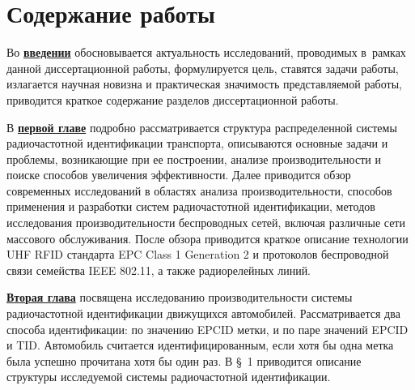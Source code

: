 \section*{Содержание работы}
Во \underline{\textbf{введении}} обосновывается актуальность исследований, проводимых в~рамках данной диссертационной работы, формулируется цель, ставятся задачи работы, излагается научная новизна и практическая значимость представляемой работы, приводится краткое содержание разделов диссертационной работы.

В \underline{\textbf{первой главе}} подробно рассматривается структура распределенной системы радиочастотной идентификации транспорта, описываются основные задачи и проблемы, возникающие при ее построении, анализе производительности и поиске способов увеличения эффективности. Далее приводится обзор современных исследований в областях анализа производительности, способов применения и разработки систем радиочастотной идентификации, методов исследования производительности беспроводных сетей, включая различные сети массового обслуживания. После обзора приводится краткое описание технологии UHF RFID стандарта EPC Class 1 Generation 2 и протоколов беспроводной связи семейства IEEE 802.11, а также радиорелейных линий.



\underline{\textbf{Вторая глава}} посвящена исследованию производительности системы радиочастотной идентификации движущихся автомобилей. Рассматривается два способа идентификации: по значению EPCID метки, и по паре значений EPCID и TID. Автомобиль считается идентифицированным, если хотя бы одна метка была успешно прочитана хотя бы один раз. В \S~1 приводится описание структуры исследуемой системы радиочастотной идентификации.

